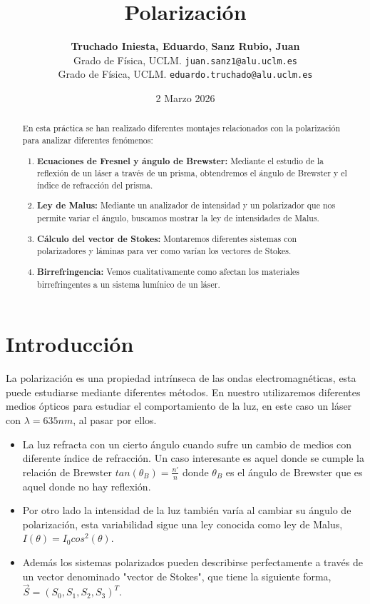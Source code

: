 \documentclass[11pt, a4paper, twocolumn]{article}
\title{\textbf{\Large Polarización}}
\author{
    \textbf{Truchado Iniesta, Eduardo}, \textbf{Sanz Rubio, Juan} \\
    \small Grado de Física, UCLM. \texttt{juan.sanz1@alu.uclm.es} \\
    \small Grado de Física, UCLM. \texttt{eduardo.truchado@alu.uclm.es}
}
\date{\small 2 Marzo 2026}
\begin{document}
\maketitle
\thispagestyle{fancy}

\begin{abstract}
En esta práctica se han realizado diferentes montajes relacionados con la polarización para analizar diferentes fenómenos: 

\begin{enumerate}
    \item \textbf{Ecuaciones de Fresnel y ángulo de Brewster:} Mediante el estudio de la reflexión de un láser a través de un
    prisma, obtendremos el ángulo de Brewster y el índice de refracción del prisma.
    \item \textbf{Ley de Malus:} Mediante un analizador de intensidad y un polarizador que nos permite variar el ángulo, buscamos
    mostrar la ley de intensidades de Malus.
    \item \textbf{Cálculo del vector de Stokes:} Montaremos diferentes sistemas con polarizadores y láminas para ver como varían los vectores de Stokes.
    \item \textbf{Birrefringencia:} Vemos cualitativamente como afectan los materiales birrefringentes a un sistema lumínico de un láser.
\end{enumerate}

\end{abstract}


\section{Introducción}

La polarización es una propiedad intrínseca de las ondas electromagnéticas, esta puede estudiarse mediante diferentes métodos. En nuestro utilizaremos diferentes medios ópticos para
estudiar el comportamiento de la luz, en este caso un láser con $\lambda = 635 nm$, al pasar por ellos.

\begin{itemize}
    \item La luz refracta con un cierto ángulo cuando sufre un cambio de medios con diferente índice de refracción. Un caso interesante es aquel donde se cumple la relación de Brewster $tan(\theta_{B}) = \frac{n'}{n}$ donde $\theta_{B}$ es el ángulo de Brewster que es aquel donde no hay reflexión.
    \item Por otro lado la intensidad de la luz también varía al cambiar su ángulo de polarización, esta variabilidad sigue una ley conocida como ley de Malus, $I(\theta) = I_{0}cos^2(\theta)$.
    \item Además los sistemas polarizados pueden describirse perfectamente a través de un vector denominado "vector de Stokes", que tiene la siguiente forma, $\vec{S} = (S_{0}, S_{1}, S_{2}, S_{3})^{T}$. 
    
\end{itemize}
\end{document}
